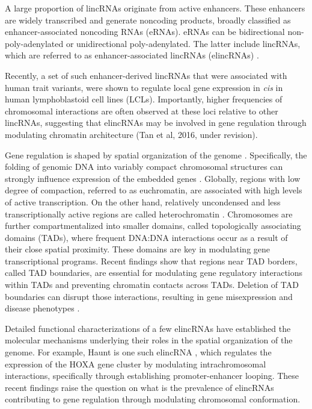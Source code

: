 \documentclass[11pt,a4paper]{report}
\begin{document}
A large proportion of lincRNAs originate from active enhancers. These enhancers are widely transcribed and generate noncoding products, broadly classified as enhancer-associated noncoding RNAs (eRNAs). eRNAs can be bidirectional non-poly-adenylated or unidirectional poly-adenylated. The latter include lincRNAs, which are referred to as enhancer-associated lincRNAs (elincRNAs) \cite{Guil2012}. 

Recently, a set of such enhancer-derived lincRNAs that were associated with human trait variants, were shown to regulate local gene expression in \textit{cis} in human lymphoblastoid cell lines (LCLs). Importantly, higher frequencies of chromosomal interactions are often observed at these loci relative to other lincRNAs, suggesting that elincRNAs may be involved in gene regulation through modulating chromatin architecture (Tan et al, 2016, under revision).

Gene regulation is shaped by spatial organization of the genome \cite{Engreitz2016}⁠⁠. Specifically, the folding of genomic DNA into variably compact chromosomal structures can strongly influence expression of the embedded genes \cite{Gorkin2014}⁠⁠. Globally, regions with low degree of compaction, referred to as euchromatin, are associated with high levels of active transcription. On the other hand, relatively uncondensed and less transcriptionally active regions are called heterochromatin \cite{Passarge1979}\cite{Tamaru2010}⁠. Chromosomes are further compartmentalized into smaller domains, called topologically associating domains (TADs), where frequent DNA:DNA interactions occur as a result of their close spatial proximity. These domains are key in modulating gene transcriptional programs. Recent findings show that regions near TAD borders, called TAD boundaries, are essential for modulating gene regulatory interactions within TADs and preventing chromatin contacts across TADs. Deletion of TAD boundaries can disrupt those interactions, resulting in gene misexpression and disease phenotypes \cite{Lupianez2015}⁠.

Detailed functional characterizations of a few elincRNAs have established the molecular mechanisms underlying their roles in the spatial organization of the genome. For example, Haunt is one such elincRNA \cite{Yin2015}⁠⁠, which regulates the expression of the HOXA gene cluster by modulating intrachromosomal interactions, specifically through establishing promoter-enhancer looping. These recent findings raise the question on what is the prevalence of elincRNAs contributing to gene regulation through modulating chromosomal conformation.
\end{document}
